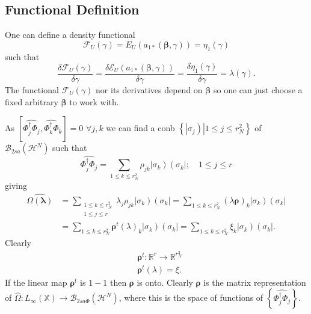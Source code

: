 \documentclass[aps,preprint]{revtex4}%
\begin{document}
\subsection{Functional Definition}

One can define a density functional
\begin{equation}
\mathcal{F}_{U}\left(  \gamma\right)  =E_{U}\left(  a_{1\ast}\left(
\mathbf{\beta,}\gamma\right)  \right)  =\eta_{1}\left(  \gamma\right)
\end{equation}
such that
\begin{equation}
\frac{\delta\mathcal{F}_{U}\left(  \gamma\right)  }{\delta\gamma}=\frac
{\delta\mathcal{E}_{U}\left(  a_{1\ast}\left(  \mathbf{\beta,}\gamma\right)
\right)  }{\delta\gamma}=\frac{\delta\eta_{1}\left(  \gamma\right)  }%
{\delta\gamma}=\lambda\left(  \gamma\right)  .
\end{equation}
The functional $\mathcal{F}_{U}\left(  \gamma\right)  $ nor its derivatives
depend on $\mathbf{\beta}$ so one can just choose a fixed arbitrary
$\mathbf{\beta}$ to work with.

As $\left[  \widehat{\Phi_{j}^{\dagger}\Phi_{j}}\widehat{,\Phi_{k}^{\dagger
}\Phi_{k}}\right]  =0$ $\forall j,k$ we can find a conb $\left\{  \left.
\left\vert \sigma_{j}\right)  \right\vert 1\leq j\leq r_{N}^{2}\right\}  $ of
$\mathcal{B}_{2sa}\left(  \mathcal{H}^{N}\right)  $ such that
\begin{equation}
\widehat{\Phi_{j}^{\dagger}\Phi_{j}}=\sum_{1\leq k\leq r_{N}^{2}}\rho
_{jk}\left\vert \sigma_{k}\right)  \left(  \sigma_{k}\right\vert ;\quad1\leq
j\leq r
\end{equation}
giving
\begin{align}
\widehat{\Omega\left(  \mathbf{\lambda}\right)  }  &  =\sum_{\substack{1\leq
k\leq r_{N}^{2}\\1\leq j\leq r}}\lambda_{j}\rho_{jk}\left\vert \sigma
_{k}\right)  \left(  \sigma_{k}\right\vert =\sum_{1\leq k\leq r_{N}^{2}%
}\left(  \lambda\mathbf{\rho}\right)  _{k}\left\vert \sigma_{k}\right)
\left(  \sigma_{k}\right\vert \nonumber\\
&  =\sum_{1\leq k\leq r_{N}^{2}}\mathbf{\rho}^{t}\left(  \lambda\right)
_{k}\left\vert \sigma_{k}\right)  \left(  \sigma_{k}\right\vert =\sum_{1\leq
k\leq r_{N}^{2}}\xi_{k}\left\vert \sigma_{k}\right)  \left(  \sigma
_{k}\right\vert .
\end{align}
Clearly
\begin{align}
&  \mathbf{\rho}^{t}:\mathbb{R}^{r}\rightarrow\mathbb{R}^{r_{N}^{2}%
}\nonumber\\
&  \mathbf{\rho}^{t}\left(  \lambda\right)  =\xi.
\end{align}
If the linear map $\mathbf{\rho}^{t}$ is $1-1$ then $\mathbf{\rho}$ is onto.
Clearly $\mathbf{\rho}$ is the matrix representation of $\widehat{\Omega
}:L_{\infty}\left(  \mathbb{X}\right)  \rightarrow\mathcal{B}_{2sa\Phi}\left(
\mathcal{H}^{N}\right)  $, where this is the space of functions of $\left\{
\widehat{\Phi_{j}^{\dagger}\Phi_{j}}\right\}  .$
\end{document}
